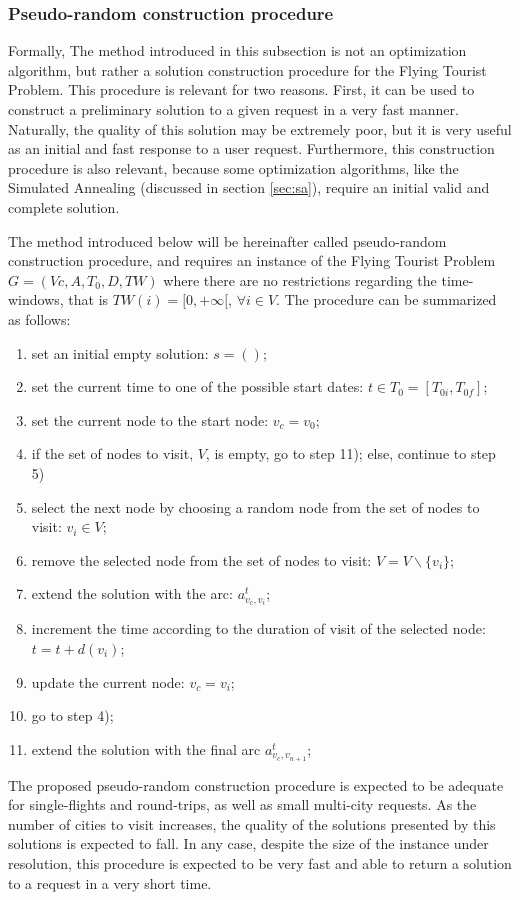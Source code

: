 \subsubsection{Pseudo-random construction procedure}
\label{sec:pseudo_random}

Formally, The method introduced in this subsection is not an optimization algorithm, but rather a solution construction procedure for the Flying Tourist Problem. This procedure is relevant for two reasons. First, it can be used to construct a preliminary solution to a given request in a very fast manner. Naturally, the quality of this solution may be extremely poor, but it is very useful as an initial and fast response to a user request. 
Furthermore, this construction procedure is also relevant, because some optimization algorithms, like the Simulated Annealing (discussed in section \ref{sec:sa}), require an initial valid and complete solution.

The method introduced below will be hereinafter called pseudo-random construction procedure, and requires an instance of the Flying Tourist Problem $G=(Vc,A,T_0,D,TW)$ where there are no restrictions regarding the time-windows, that is $TW(i) = [0, +\infty[$, $\forall i \in V$. The procedure can be summarized as follows:

\begin{enumerate}
\itemsep0em 
    \item set an initial empty solution: $s=()$;
    \item set the current time to one of the possible start dates: $t \in T_0=[T_{0i}, T_{0f}]$;
    \item set the current node to the start node: $v_c = v_0$;
    \item if the set of nodes to visit, $V$, is empty, go to step 11); else, continue to step 5)
    \item select the next node by choosing a random node from the set of nodes to visit: $v_i \in V$;
    \item remove the selected node from the set of nodes to visit: $V=V\backslash\{v_i\}$;
    \item extend the solution with the arc: $a_{v_c, v_i}^t$;
    \item increment the time according to the duration of visit of the selected node: $t=t+d(v_i)$;
    \item update the current node: $v_c=v_i$;
    \item go to step 4);
    \item extend the solution with the final arc $a_{v_c, v_{n+1}}^t$;
\end{enumerate}

The proposed pseudo-random construction procedure is expected to be adequate for single-flights and round-trips, as well as small multi-city requests. As the number of cities to visit increases, the quality of the solutions presented by this solutions is expected to fall. In any case, despite the size of the instance under resolution, this procedure is expected to be very fast and able to return a solution to a request in a very short time.